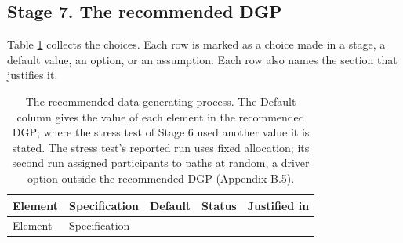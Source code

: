 \documentclass[
  11pt,
]{article}
\begin{document}
\subsection{Stage 7. The recommended DGP}\label{stage-7.-the-recommended-dgp}

Table \ref{tab:spec} collects the choices. Each row is marked as a
choice made in a stage, a default value, an option, or an assumption.
Each row also names the section that justifies it.

\begin{longtable}[]{@{}
  >{\raggedright\arraybackslash}p{}
  >{\raggedright\arraybackslash}p{}
  >{\raggedright\arraybackslash}p{}
  >{\raggedright\arraybackslash}p{}
  >{\raggedright\arraybackslash}p{}@{}}
\caption{\label{tab:spec} The recommended data-generating process. The Default column gives the value of each element in the recommended DGP; where the stress test of Stage 6 used another value it is stated. The stress test's reported run uses fixed allocation; its second run assigned participants to paths at random, a driver option outside the recommended DGP (Appendix B.5).}\tabularnewline
\toprule\noalign{}
\begin{minipage}[b]{\linewidth}\raggedright
Element
\end{minipage} & \begin{minipage}[b]{\linewidth}\raggedright
Specification
\end{minipage} & \begin{minipage}[b]{\linewidth}\raggedright
Default
\end{minipage} & \begin{minipage}[b]{\linewidth}\raggedright
Status
\end{minipage} & \begin{minipage}[b]{\linewidth}\raggedright
Justified in
\end{minipage} \\
\midrule\noalign{}
\endfirsthead
\toprule\noalign{}
\begin{minipage}[b]{\linewidth}\raggedright
Element
\end{minipage} & \begin{minipage}[b]{\linewidth}\raggedright
Specification
\end{minipage} & \begin{minipage}[b]{\linewidth}\raggedright

\end{minipage}
\end{longtable}
\end{document}
